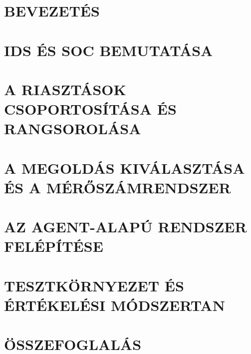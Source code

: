 \documentclass[12pt,a4paper]{article}
\begin{document}
\newpage
{}
\tableofcontents
\newpage




\clearpage
\section{BEVEZETÉS}


\clearpage
\section{IDS ÉS SOC BEMUTATÁSA}\label{sec:ids-soc}


\clearpage
\section{A RIASZTÁSOK CSOPORTOSÍTÁSA ÉS RANGSOROLÁSA}\label{sec:modszerek}


\clearpage
\section{A MEGOLDÁS KIVÁLASZTÁSA ÉS A MÉRŐSZÁMRENDSZER}\label{sec:megoldas}


\clearpage
\section{AZ AGENT-ALAPÚ RENDSZER FELÉPÍTÉSE}\label{sec:rendszer}


\clearpage
\section{TESZTKÖRNYEZET ÉS ÉRTÉKELÉSI MÓDSZERTAN}\label{sec:ertekeles}












\clearpage
\section{ÖSSZEFOGLALÁS}

\end{document}
